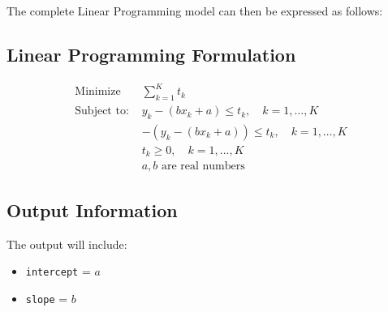 \documentclass{article}
\begin{document}
The complete Linear Programming model can then be expressed as follows:

\subsection*{Linear Programming Formulation}

\begin{align*}
\text{Minimize } & \sum_{k=1}^{K} t_k \\
\text{Subject to: } & y_k - (bx_k + a) \leq t_k, \quad k = 1, \ldots, K \\
& -(y_k - (bx_k + a)) \leq t_k, \quad k = 1, \ldots, K \\
& t_k \geq 0, \quad k = 1, \ldots, K \\
& a, b \text{ are real numbers}
\end{align*}

\subsection*{Output Information}

The output will include:

\begin{itemize}
    \item \texttt{intercept} = \(a\)
    \item \texttt{slope} = \(b\)
\end{itemize}
\end{document}
